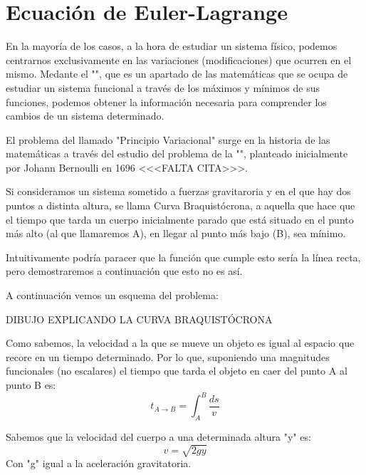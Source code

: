 \section{Ecuación de Euler-Lagrange}\label{sec:ecuacion-de-euler-lagrange}

En la mayoría de los casos, a la hora de estudiar un sistema físico, podemos centrarnos exclusivamente en las variaciones (modificaciones) que ocurren en el mismo. Medante el "", que es un apartado de las matemáticas que se ocupa de estudiar un sistema funcional a través de los máximos y mínimos de sus funciones, podemos obtener la información necesaria para comprender los cambios de un sistema determinado.

El problema del llamado "Principio Variacional" surge en la historia de las matemáticas a través del estudio del problema de la "", planteado inicialmente por Johann Bernoulli en 1696 <<<FALTA CITA>>>.

Si consideramos un sistema sometido a fuerzas gravitaroria y en el que hay dos puntos a distinta altura, se llama Curva Braquistócrona, a aquella que hace que el tiempo que tarda un cuerpo inicialmente parado que está situado en el punto más alto (al que llamaremos A), en llegar al punto más bajo (B), sea mínimo.

Intuitivamente podría paracer que la función que cumple esto sería la línea recta, pero demostraremos a continuación que esto no es así.

A continuación vemos un esquema del problema:

DIBUJO EXPLICANDO LA CURVA BRAQUISTÓCRONA

Como sabemos, la velocidad a la que se mueve un objeto es igual al espacio que recore en un tiempo determinado. Por lo que, suponiendo una magnitudes funcionales (no escalares) el tiempo que tarda el objeto en caer del punto A al punto B es:
\begin{equation}
	\label{eq:tiempo}
	t_{A\xrightarrow{}B}=\int_{A}^{B}\frac{ds}{v}
\end{equation}

Sabemos que la velocidad del cuerpo a una determinada altura "y" es:
\begin{equation}
	\label{eq:velocidad_caida}
	v=\sqrt{2gy}
\end{equation}
Con "g" igual a la aceleración gravitatoria.


